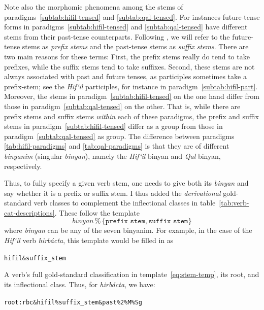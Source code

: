 {Note also the morphomic phenomena among the stems of  paradigms~\ref{subtab:hifil-tensed} and \ref{subtab:qal-tensed}.
For instances future-tense forms in paradigms~\ref{subtab:hifil-tensed} and \ref{subtab:qal-tensed} have different stems from their past-tense counterparts. Following \citet{vance:2004}, we will refer to the future-tense stems as \emph{prefix stems} and the past-tense stems as \emph{suffix stems}. There are two main reasons for these terms: First, the prefix stems really do tend to take prefixes, while the suffix stems tend to take suffixes. Second, these stems are not always associated with past and future tenses, as participles sometimes take a prefix-stem; see the \textit{Hif`il} participles, for instance in paradigm~\ref{subtab:hifil-part}. 
Moreover, the stems in paradigm~\ref{subtab:hifil-tensed} on the one hand differ from those in paradigm~\ref{subtab:qal-tensed} on the other. That is, while there are prefix stems and suffix stems \emph{within} each of these paradigms, the prefix and suffix stems in paradigm~\ref{subtab:hifil-tensed} differ as a group from those in paradigm~\ref{subtab:qal-tensed} as group. The difference between paradigms \ref{tab:hifil-paradigms} and  \ref{tab:qal-paradigms} is that they are of different \emph{binyanim} (singular \emph{binyan}), namely the \emph{Hif`il} binyan and \emph{Qal} binyan, respectively.
 
 Thus, to fully specify a given verb stem, one needs to give both its \emph{binyan} and say whether it is a prefix or suffix stem. I thus added the \emph{derivational} gold-standard verb classes to complement the inflectional classes in table~\ref{tab:verb-cat-descriptions}. These follow the template
 \begin{equation}\label{eq:stem-temp}
\textit{binyan}  \, \texttt{\%} \, \{ \texttt{prefix\_stem}, \texttt{suffix\_stem} \}
 \end{equation}
 where \textit{binyan} can be any of the seven binyanim. For example, in the case of the \emph{Hif`il} verb \textit{hirb\'{a}cta}, this template would be filled in as 
  \begin{center}
    \texttt{hifil\&suffix\_stem}
  \end{center}
 A verb's full gold-standard classification in template~\eqref{eq:stem-temp}, its root, and its inflectional class. Thus, for \textit{hirb\'{a}cta}, we have:
\begin{center}
\texttt{root:rbc\&hifil\%suffix\_stem\&past\%2\%M\%Sg}
 \end{center}
 
}
